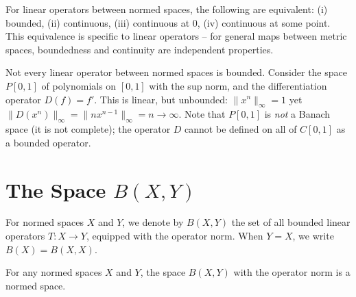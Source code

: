 \documentclass[11pt,a4paper]{article}
\begin{document}
\begin{keyresult}[title={Bounded = Continuous for Linear Operators}]
For linear operators between normed spaces, the following are equivalent:
(i) bounded, (ii) continuous, (iii) continuous at $0$,
(iv) continuous at some point. This equivalence is specific to linear
operators -- for general maps between metric spaces, boundedness and
continuity are independent properties.
\end{keyresult}

\begin{warning}[title={Unbounded Linear Operators Exist}]
\label{warn:unbounded}
Not every linear operator between normed spaces is bounded. Consider the
space $P[0,1]$ of polynomials on $[0,1]$ with the sup norm, and the
differentiation operator $D(f) = f'$. This is linear, but unbounded:
$\|x^n\|_\infty = 1$ yet $\|D(x^n)\|_\infty = \|nx^{n-1}\|_\infty = n
\to \infty$. Note that $P[0,1]$ is \emph{not} a Banach space (it is not
complete); the operator $D$ cannot be defined on all of $C[0,1]$ as a
bounded operator.
\end{warning}


\section{The Space $B(X,Y)$}
\label{sec:BXY}

\begin{definition}
\label{def:BXY}
For normed spaces $X$ and $Y$, we denote by $B(X,Y)$ the set of all bounded
linear operators $T \colon X \to Y$, equipped with the operator norm. When
$Y = X$, we write $B(X) = B(X,X)$.
\end{definition}

\begin{theorem}
\label{thm:BXY_normed}
For any normed spaces $X$ and $Y$, the space $B(X,Y)$ with the operator norm
is a normed space.
\end{theorem}
\end{document}
